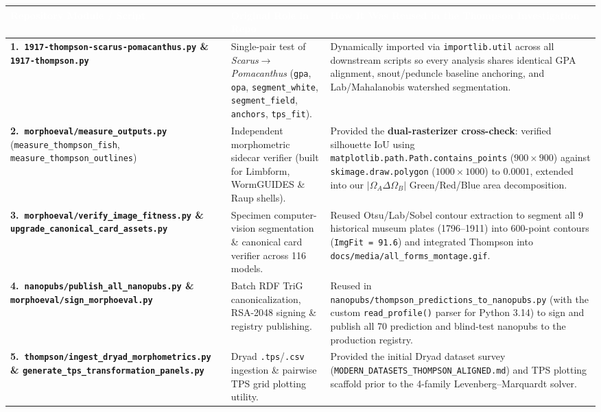 \documentclass[10pt,a4paper]{article}
\begin{document}
\begin{table}[h!]
\centering
\renewcommand{\arraystretch}{1.24}
\scriptsize
\begin{tabular}{@{}p{}p{}p{}@{}}
\toprule
\rowcolor{navybg}
\textcolor{white}{\textbf{Repository Module / Script}} & \textcolor{white}{\textbf{Original Role in Repo}} & \textcolor{white}{\textbf{How It Was Reused in the Thompson Investigation}} \\
\midrule
\rowcolor{softgray}
\textbf{1.\ \texttt{1917-thompson-scarus-pomacanthus.py} \& \texttt{1917-thompson.py}} & Single-pair test of \emph{Scarus}$\to$\emph{Pomacanthus} (\texttt{gpa}, \texttt{opa}, \texttt{segment\_white}, \texttt{segment\_field}, \texttt{anchors}, \texttt{tps\_fit}). & Dynamically imported via \texttt{importlib.util} across all downstream scripts so every analysis shares identical GPA alignment, snout/peduncle baseline anchoring, and Lab/Mahalanobis watershed segmentation. \\
\textbf{2.\ \texttt{morphoeval/measure\_outputs.py}} (\texttt{measure\_thompson\_fish}, \texttt{measure\_thompson\_outlines}) & Independent morphometric sidecar verifier (built for Limbform, WormGUIDES \& Raup shells). & Provided the \textbf{dual-rasterizer cross-check}: verified silhouette $\mathrm{IoU}$ using \texttt{matplotlib.path.Path.contains\_points} ($900\times 900$) against \texttt{skimage.draw.polygon} ($1000\times 1000$) to $0.0001$, extended into our $|\Omega_A \Delta \Omega_B|$ Green/Red/Blue area decomposition. \\
\rowcolor{softgray}
\textbf{3.\ \texttt{morphoeval/verify\_image\_fitness.py} \& \texttt{upgrade\_canonical\_card\_assets.py}} & Specimen computer-vision segmentation \& canonical card verifier across 116 models. & Reused Otsu/Lab/Sobel contour extraction to segment all 9 historical museum plates (1796--1911) into 600-point contours (\texttt{ImgFit = 91.6}) and integrated Thompson into \texttt{docs/media/all\_forms\_montage.gif}. \\
\textbf{4.\ \texttt{nanopubs/publish\_all\_nanopubs.py} \& \texttt{morphoeval/sign\_morphoeval.py}} & Batch RDF TriG canonicalization, RSA-2048 signing \& registry publishing. & Reused in \texttt{nanopubs/thompson\_predictions\_to\_nanopubs.py} (with the custom \texttt{read\_profile()} parser for Python 3.14) to sign and publish all 70 prediction and blind-test nanopubs to the production registry. \\
\rowcolor{softgray}
\textbf{5.\ \texttt{thompson/ingest\_dryad\_morphometrics.py} \& \texttt{generate\_tps\_transformation\_panels.py}} & Dryad \texttt{.tps}/\texttt{.csv} ingestion \& pairwise TPS grid plotting utility. & Provided the initial Dryad dataset survey (\texttt{MODERN\_DATASETS\_THOMPSON\_ALIGNED.md}) and TPS plotting scaffold prior to the 4-family Levenberg--Marquardt solver. \\

\end{tabular}
\end{table}
\end{document}
